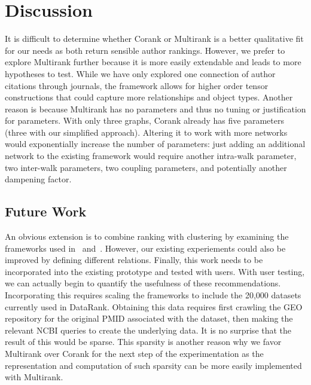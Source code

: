 \section{Discussion}
It is difficult to determine whether Corank or Multirank is a better qualitative fit for our needs as both return sensible author rankings. However, we prefer to explore Multirank further because it is more easily extendable and leads to more hypotheses to test. While we have only explored one connection of author citations through journals, the framework allows for higher order tensor constructions that could capture more relationships and object types. Another reason is because Multirank has no parameters and thus no tuning or justification for parameters. With only three graphs, Corank already has five parameters (three with our simplified approach). Altering it to work with more networks would exponentially increase the number of parameters: just adding an additional network to the existing framework would require another intra-walk parameter, two inter-walk parameters, two coupling parameters, and potentially another dampening factor.

\subsection{Future Work}
An obvious extension is to combine ranking with clustering by examining the frameworks used in~\cite{sun2009rankclus} and~\cite{varadharajalu2011author}. However, our existing experiements could also be improved by defining different relations. Finally, this work needs to be incorporated into the existing prototype and tested with users. With user testing, we can actually begin to quantify the usefulness of these recommendations. Incorporating this requires scaling the frameworks to include the 20,000 datasets currently used in DataRank. Obtaining this data requires first crawling the GEO repository for the original PMID associated with the dataset, then making the relevant NCBI queries to create the underlying data. It is no surprise that the result of this would be sparse. This sparsity is another reason why we favor Multirank over Corank for the next step of the experimentation as the representation and computation of such sparsity can be more easily implemented with Multirank.

